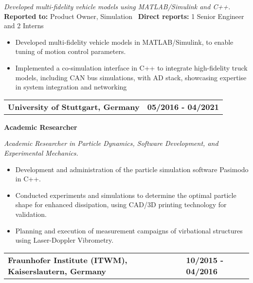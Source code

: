\documentclass[a4paper,10pt]{article}
\begin{document}
\vspace{0.2cm}
\noindent
\textit{Developed multi-fidelity vehicle models using MATLAB/Simulink and C++.}\\

\vspace{-0.3cm}
\noindent
\textbf{Reported to:} Product Owner, Simulation \, \textbf{Direct reports:} 1 Senior Engineer and 2 Interns\,
\begin{itemize}[itemsep=0pt, topsep=5pt]
    \item Developed multi-fidelity vehicle models in MATLAB/Simulink, to enable tuning of motion control parameters.
    \item Implemented a co-simulation interface in C++ to integrate
        high-fidelity truck models, including CAN bus simulations, with AD
        stack, showcasing expertise in system integration and networking
\end{itemize}

\vspace{0.3cm}
\noindent
\begin{tabular}{ @{\hskip 0pt}m{} >{\raggedleft\arraybackslash}p{} }
    \noindent\textbf{University of Stuttgart, Germany} & \textbf{05/2016 - 04/2021}
\end{tabular}

\noindent
\colorbox{gray!40}{%
    \parbox{0.99\textwidth}{%
        \textcolor{highlightcolor}{\textbf{Academic Researcher}}
    }%
}

\vspace{0.2cm}
\noindent
\textit{Academic Researcher in Particle Dynamics, Software Development, and Experimental Mechanics.}\\
\vspace{-0.4cm}
\noindent
\begin{itemize}[itemsep=0pt, topsep=5pt]
    \item Development and administration of the particle simulation
        software Pasimodo in C++.
    \item Conducted experiments and simulations to determine the optimal
        particle shape for enhanced dissipation, using CAD/3D printing
        technology for validation.
    \item Planning and execution of measurement campaigns of
        virbational structures using Laser-Doppler Vibrometry.
\end{itemize}

\vspace{0.3cm}
\noindent
\begin{tabular}{ @{\hskip 0pt}m{} >{\raggedleft\arraybackslash}p{} }
    \noindent\textbf{Fraunhofer Institute (ITWM), Kaiserslautern, Germany} & \textbf{10/2015 - 04/2016}
\end{tabular}
\end{document}
